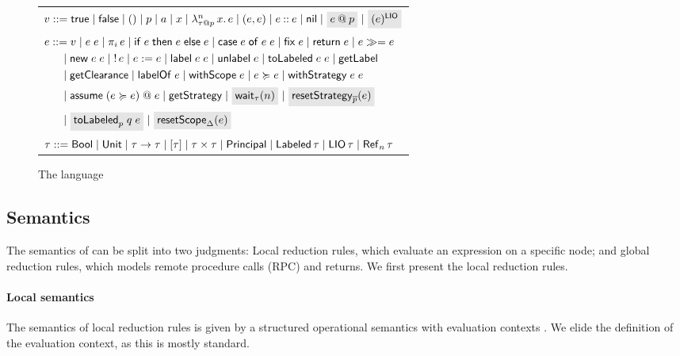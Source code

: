 \begin{figure*}
    \centering
    \begin{tabular}{l}
         $\val ::= \true \mid \false \mid () \mid p \mid \addr \mid x \mid \abs{n}{\lb{p}{\type}}{x}{\expr} \mid (\expr, \expr) \mid \cons{\expr}{\expr} \mid \nil \mid \graybox{\lb{p}{\expr}} \mid \graybox{\lio{\expr}}$ \\
         $\begin{aligned}[t]
         \expr &::= \val \mid \app{\expr}{\expr} \mid \proj{i}{\expr} \mid \ifexpr{\expr}{\expr}{\expr} \mid \case{\expr}{\expr}{\expr} \mid \fix{\expr} \mid \return{\expr} \mid \bind{\expr}{\expr} \\ &\quad \mid
         \new{\expr}{\expr} \mid \readref{\expr} \mid \writeref{\expr}{\expr} \mid \Label{\expr}{\expr} \mid \unlabel{\expr} \mid
         \tolabeled{\expr}{\expr} \mid \getlabel \\ &\quad \mid \getclearance \mid \labelof{\expr} \mid \withscope{\expr} \mid \expr \actsfor \expr \mid \withstrategy{\expr}{\expr} \\ &\quad \mid \adddelegate{\expr}{\expr}{\expr} \mid \getstrategy \mid \graybox{\wait{n}[\type]} \mid \graybox{\resetstrategy{\overline{p}}{\expr}} \\ &\quad \mid \graybox{\resetTolabeled{p}{q}{\expr}} \mid \graybox{\resetscope{\scope}{\expr}}
         \end{aligned}$ \\
         $\type ::= \bool \mid \unit \mid \func{\type}{\type} \mid \listtype{\type} \mid \pair{\type}{\type} \mid \labeltype \mid \labeled{\type} \mid \liotype{\type} \mid \reftype[n]{\type}$ \\
    \end{tabular}
    \caption{The \lang{} language}
    \label{fig:language-syntax}
\end{figure*}

\subsection{Semantics}\label{sec:semantics}
The semantics of \lang{} can be split into two judgments: Local reduction rules, which evaluate an expression on a specific node; and global reduction rules, which models remote procedure calls (RPC) and returns. We first present the local reduction rules.

\paragraph{Local semantics}
The semantics of local reduction rules is given by a structured operational semantics with evaluation contexts \cite{Felleisen:1988:TPF:73560.73576}. We elide the definition of the evaluation context, as this is mostly standard.

